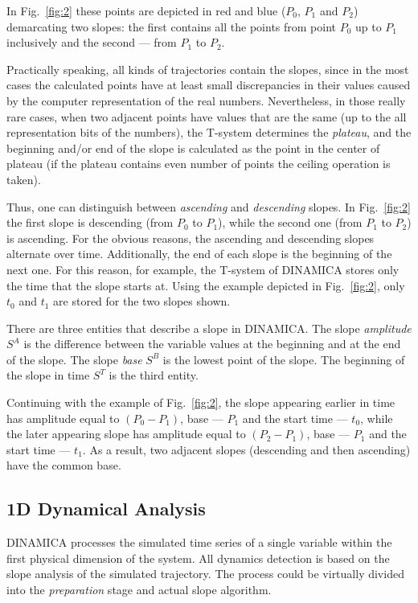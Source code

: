 \documentclass[11pt,a4paper]{article}
\begin{document}
In Fig.~\ref{fig:2} these points are depicted in red and blue ($P_0$, $P_1$ and
$P_2$) demarcating two slopes: the first contains all the points from point $P_0$ up
to $P_1$ inclusively and the second --- from $P_1$ to $P_2$.

Practically speaking, all kinds of trajectories contain the slopes, since in the most
cases the calculated points have at least small discrepancies in their values caused
by the computer representation of the real numbers. Nevertheless, in those really
rare cases, when two adjacent points have values that are the same (up to the all
representation bits of the numbers), the T-system determines the \textit{plateau},
and the beginning and/or end of the slope is calculated as the point in the center of
plateau (if the plateau contains even number of points the ceiling operation is
taken).

Thus, one can distinguish between \textit{ascending} and \textit{descending}
slopes. In Fig.~\ref{fig:2} the first slope is descending (from $P_0$ to $P_1$),
while the second one (from $P_1$ to $P_2$) is ascending. For the obvious reasons, the
ascending and descending slopes alternate over time. Additionally, the end of each
slope is the beginning of the next one. For this reason, for example, the T-system of
DINAMICA stores only the time that the slope starts at. Using the example depicted in
Fig.~\ref{fig:2}, only $t_0$ and $t_1$ are stored for the two slopes shown.

There are three entities that describe a slope in DINAMICA. The slope
\textit{amplitude} $S^A$ is the difference between the variable values at the beginning and
at the end of the slope. The slope \textit{base} $S^B$ is the lowest point of the
slope. The beginning of the slope in time $S^T$ is the third entity.

Continuing with the example of Fig.~\ref{fig:2}, the slope appearing earlier in time
has amplitude equal to $(P_0-P_1)$, base --- $P_1$ and the start time --- $t_0$,
while the later appearing slope has amplitude equal to $(P_2-P_1)$, base --- $P_1$ and
the start time --- $t_1$. As a result, two adjacent slopes (descending and then
ascending) have the common base.

\subsection{1D Dynamical Analysis}
\label{sec:dynam-regime-detect}

DINAMICA processes the simulated time series of a single variable within the first
physical dimension of the system. All dynamics detection is based on the slope
analysis of the simulated trajectory. The process could be virtually divided into the
\textit{preparation} stage and actual slope algorithm.
\end{document}
